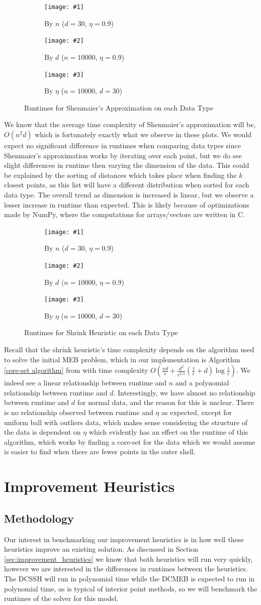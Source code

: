 \documentclass[11pt,twoside]{report}
\newcommand{\benchmarkfigure}[5]{
    \begin{figure}[ht]
        \centering
        \begin{subfigure}[b]{0.475\textwidth}
            \centering
            \texttt{[image: \#1]}
            \caption{By $n$ ($d=30$, $\eta=0.9$)}
            \label{#5_n}
        \end{subfigure}
        \hfill
        \begin{subfigure}[b]{0.475\textwidth}
            \centering
            \texttt{[image: \#2]}
            \caption{By $d$ ($n=10000$, $\eta=0.9$)}
            \label{#5_d}
        \end{subfigure}
        
        \begin{subfigure}[b]{0.475\textwidth}
            \centering
            \texttt{[image: \#3]}
            \caption{By $\eta$ ($n=10000$, $d=30$)}
            \label{#5_eta}
        \end{subfigure}
        \caption{#4}
        \label{#5}
    \end{figure}
}
\newcommand{\benchmarkfigurebyfunc}[3]{
    \benchmarkfigure{alg_benchmarks/by_func/#1_func_n_d30_eta0p9.png}{alg_benchmarks/by_func/#1_func_d_n10000_eta0p9.png}{alg_benchmarks/by_func/#1_func_eta_n10000_d30.png}{#2}{#3}
}
\theoremstyle{definition}
\numberwithin{theorem}{section}
\numberwithin{definition}{section}
\numberwithin{lemma}{section}
\numberwithin{proposition}{section}
\numberwithin{equation}{section}
\numberwithin{figure}{section}
\begin{document}
\benchmarkfigurebyfunc{shenmaier}{Runtimes for Shenmaier's Approximation on each Data Type}{fig:shenmaier_benchmarks}
We know that the average time complexity of Shenmaier's approximation will be, $O(n^2d)$ which is fortunately exactly what we observe in these plots. We would expect no significant difference in runtimes when comparing data types since Shenmaier's approximation works by iterating over each point, but we do see slight differences in runtime then varying the dimension of the data. This could be explained by the sorting of distances which takes place when finding the $k$ closest points, as this list will have a different distribution when sorted for each data type. The overall trend as dimension is increased is linear, but we observe a lesser increase in runtime than expected. This is likely because of optimizations made by NumPy, where the computations for arrays/vectors are written in C.


\benchmarkfigurebyfunc{shrink}{Runtimes for Shrink Heuristic on each Data Type}{fig:shrink_benchmarks}
Recall that the shrink heuristic's time complexity depends on the algorithm used to solve the initial MEB problem, which in our implementation is Algorithm \ref{core-set algorithm} from \cite{core-sets} with time complexity $O\left(\frac{nd}{\epsilon}+\frac{d^2}{\epsilon^{3/2}}\left(\frac{1}{\epsilon}+d\right)\log\frac{1}{\epsilon}\right)$. We indeed see a linear relationship between runtime and $n$ and a polynomial relationship between runtime and $d$. Interestingly, we have almost no relationship between runtime and $d$ for normal data, and the reason for this is unclear. There is no relationship observed between runtime and $\eta$ as expected, except for uniform ball with outliers data, which makes sense considering the structure of the data is dependent on $\eta$ which evidently has an effect on the runtime of this algorithm, which works by finding a core-set for the data which we would assume is easier to find when there are fewer points in the outer shell.

\section{Improvement Heuristics}
\subsection{Methodology}
Our interest in benchmarking our improvement heuristics is in how well these heuristics improve an existing solution. As discussed in Section \ref{sec:improvement_heuristics} we know that both heuristics will run very quickly, however we are interested in the differences in runtimes between the heuristics. The DCSSH will run in polynomial time while the DCMEB is expected to run in polynomial time, as is typical of interior point methods, so we will benchmark the runtimes of the solver for this model.
\end{document}
